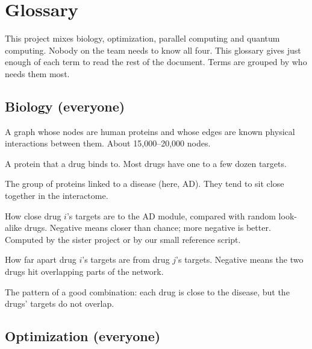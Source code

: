 \section{Glossary}
\label{app:glossary}

This project mixes biology, optimization, parallel computing and quantum computing. Nobody on the team needs to know all four. This glossary gives just enough of each term to read the rest of the document. Terms are grouped by who needs them most.

\subsection{Biology (everyone)}

\begin{description}[leftmargin=0.4cm,style=nextline]
\item[Interactome] A graph whose nodes are human proteins and whose edges are known physical interactions between them. About 15{,}000--20{,}000 nodes.
\item[Target] A protein that a drug binds to. Most drugs have one to a few dozen targets.
\item[Disease module] The group of proteins linked to a disease (here, AD). They tend to sit close together in the interactome.
\item[Proximity score $z_i$] How close drug $i$'s targets are to the AD module, compared with random look-alike drugs. Negative means closer than chance; more negative is better. Computed by the sister project or by our small reference script.
\item[Separation $s_{ij}$] How far apart drug $i$'s targets are from drug $j$'s targets. Negative means the two drugs hit overlapping parts of the network.
\item[Complementary exposure] The pattern of a good combination: each drug is close to the disease, but the drugs' targets do not overlap.
\end{description}

\subsection{Optimization (everyone)}

